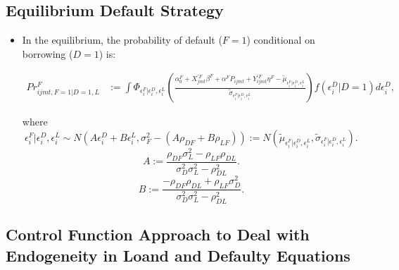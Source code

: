 \documentclass[]{book}
\providecommand{\tightlist}{%
  \setlength{\itemsep}{0pt}\setlength{\parskip}{0pt}}
\begin{document}
\subsection{Equilibrium Default
Strategy}\label{equilibrium-default-strategy}

\begin{itemize}
\tightlist
\item
  In the equilibrium, the probability of default (\(F = 1\)) conditional
  on borrowing (\(D = 1\)) is:

  \begin{equation}
  \begin{split}
  Pr_{ijmt, F = 1| D = 1, L}^F &:= \int \Phi_{\epsilon_i^F|\epsilon_i^D, \epsilon_i^L}\left(\frac{\alpha_0^F + X_{jmt}^{\prime F} \beta^F + \alpha^F P_{ijmt} + Y_{ijmt}^{\prime F} \eta^F - \tilde{\mu}_{\epsilon_i^F|\epsilon_i^D, \epsilon_i^L}}{\tilde{\sigma}_{\epsilon_i^F | \epsilon_i^D, \epsilon_i^L}} \right) f(\epsilon_i^D | D = 1) d\epsilon_i^D,
  \end{split} \label{eq:default-strategy}
  \end{equation}

  where \[
  \epsilon_i^F | \epsilon_i^D, \epsilon_i^L \sim N(A \epsilon_i^D + B \epsilon_i^L, \sigma_F^2 - (A \rho_{DF} + B \rho_{LF})) := N(\tilde{\mu}_{\epsilon_i^F|\epsilon_i^D, \epsilon_i^L}, \tilde{\sigma}_{\epsilon_i^F | \epsilon_i^D, \epsilon_i^L}).
  \] \[
  A := \frac{\rho_{DF} \sigma_L^2 - \rho_{LF} \rho_{DL}}{\sigma_D^2 \sigma_L^2 - \rho_{DL}^2}.
  \] \[
  B := \frac{-\rho_{DF} \rho_{DL} + \rho_{LF} \sigma_D^2}{\sigma_D^2 \sigma_L^2 - \rho_{DL}^2}.
  \]
\end{itemize}

\subsection{Control Function Approach to Deal with Endogeneity in Loand
and Defaulty
Equations}\label{control-function-approach-to-deal-with-endogeneity-in-loand-and-defaulty-equations}
\end{document}
